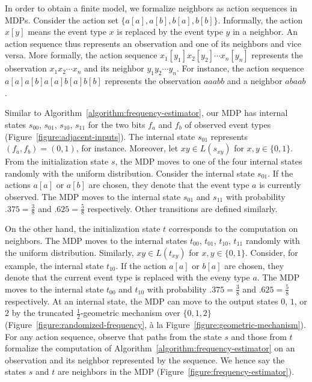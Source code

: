 In order to obtain a finite model, we formalize neighbors as action
sequences in MDPs. Consider the action set $\{
a[a], a[b], b[a], b[b] \}$. Informally, the action $x[y]$ means the
event type $x$ is replaced by the event type $y$ in a neighbor. An
action sequence thus represents an observation and one of its
neighbors and vice versa. More formally, the action sequence
$x_1[y_1]x_2[y_2]\cdots x_n[y_n]$ represents the observation
$x_1x_2\cdots x_n$ and its neighbor $y_1y_2\cdots y_n$. For instance,
the action sequence $a[a]a[b]a[a]b[a]b[b]$ represents the observation
$aaabb$ and a neighbor $abaab$.

Similar to Algorithm~\ref{algorithm:frequency-estimator}, our MDP has internal states $s_{00}$, $s_{01}$, $s_{10}$,
$s_{11}$ for the two bits $f_a$ and $f_b$ of observed event types
(Figure~\ref{figure:adjacent-inputs}). The internal state $s_{01}$
represents $(f_a, f_b) = (0, 1)$, for instance. Moreover, let $xy \in
L (s_{xy})$ for $x, y \in \{ 0, 1 \}$. From the
initialization state $s$, the MDP moves to one of
the four internal states randomly with the uniform
distribution. Consider the internal state $s_{01}$. If the actions $a[a]$
or $a[b]$ are chosen, they denote that the event type $a$ is currently
observed. The MDP moves to the internal state $s_{01}$
and $s_{11}$ with probability $.375 = \frac{3}{8}$ and $.625 =
\frac{5}{8}$ respectively. Other transitions are defined similarly.

On the other hand, the initialization state $t$
corresponds to the computation on neighbors. The MDP moves to the internal states $t_{00}$,
$t_{01}$, $t_{10}$, $t_{11}$ randomly with
the uniform distribution. Similarly, $xy \in L (t_{xy})$ for $x, y \in
\{ 0, 1 \}$.
Consider, for example, the internal state
$t_{10}$. If the action $a[a]$ or $b[a]$ are chosen, they
denote that the current event type is replaced with the eveny type
$a$. The MDP moves to the internal state
$t_{00}$ and $t_{10}$ with probability $.375 =
\frac{3}{8}$ and $.625 = \frac{5}{8}$ respectively. At an internal
state, the MDP can move to the output states $0$,
$1$, or $2$ by the truncated $\frac{1}{2}$-geometric mechanism over
$\{ 0, 1, 2 \}$ (Figure~\ref{figure:randomized-frequency}, \`{a} la
Figure~\ref{figure:geometric-mechanism}). For any action sequence,
observe that paths from the state $s$ and those from $t$
formalize the computation of Algorithm~\ref{algorithm:frequency-estimator}
on an observation and its neighbor represented by the sequence. We
hence say the states $s$ and $t$ are neighbors in the
MDP (Figure~\ref{figure:frequency-estimator}).

